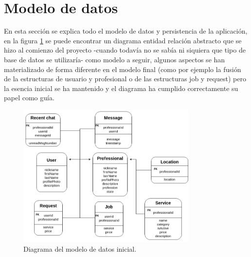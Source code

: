 \section{Modelo de datos}
En esta sección se explica todo el modelo de datos y persistencia de la aplicación, en la figura \ref{fig:er_inicial} se puede encontrar un diagrama entidad relación abstracto que se hizo al comienzo del proyecto -cuando todavía no se sabía ni siquiera que tipo de base de datos se utilizaría- como modelo a seguir, algunos aspectos se han materializado de forma diferente en el modelo final (como por ejemplo la fusión de la estructuras de usuario y profesional o de las estructuras job y request) pero la esencia inicial se ha mantenido y el diagrama ha cumplido correctamente su papel como guía.
\begin{figure}[h]
    \centering
    \includegraphics[width = 0.8\textwidth]{Imagenes/drawio/modelo_datos_inicial.png}
    \caption{Diagrama del modelo de datos inicial.}
    \label{fig:er_inicial}
\end{figure}
